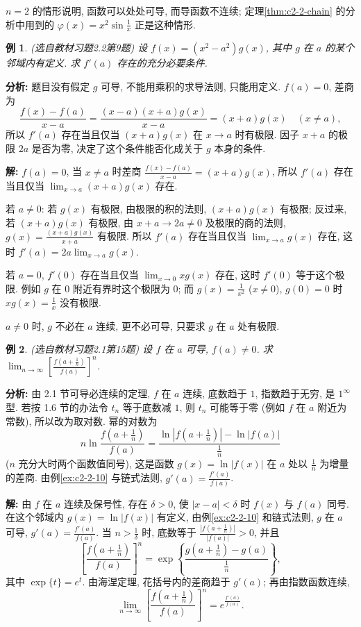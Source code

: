 \documentclass[UTF8,openany]{ctexbook}
\theoremstyle{chinesetextbook}
\newtheorem{example}{例}[section]
\newenvironment{cnsolution}{\par\indent\textbf{解:} \ignorespaces}{\par}
\begin{document}
$n=2$ 的情形说明, 函数可以处处可导, 而导函数不连续; 定理\ref{thm:c2-2-chain} 的分析中用到的 $\displaystyle\varphi(x)=x^2\sin\frac1x$ 正是这种情形.
\begin{example}\label{ex:c2-h2-9}
\textnormal{(选自教材习题2.2第9题)} 设 $f(x)=(x^2-a^2)g(x)$, 其中 $g$ 在 $a$ 的某个邻域内有定义. 求 $f'(a)$ 存在的充分必要条件.
\end{example}
\par\indent\textbf{分析:} 题目没有假定 $g$ 可导, 不能用乘积的求导法则, 只能用定义. $f(a)=0$, 差商为
\[
\frac{f(x)-f(a)}{x-a}=\frac{(x-a)(x+a)g(x)}{x-a}=(x+a)g(x)\quad(x\ne a),
\]
所以 $f'(a)$ 存在当且仅当 $(x+a)g(x)$ 在 $x\to a$ 时有极限. 因子 $x+a$ 的极限 $2a$ 是否为零, 决定了这个条件能否化成关于 $g$ 本身的条件.
\begin{cnsolution}
$f(a)=0$, 当 $x\ne a$ 时差商 $\displaystyle\frac{f(x)-f(a)}{x-a}=(x+a)g(x)$, 所以 $f'(a)$ 存在当且仅当 $\displaystyle\lim_{x\to a}(x+a)g(x)$ 存在.

若 $a\ne0$: 若 $g(x)$ 有极限, 由极限的积的法则, $(x+a)g(x)$ 有极限; 反过来, 若 $(x+a)g(x)$ 有极限, 由 $x+a\to2a\ne0$ 及极限的商的法则, $\displaystyle g(x)=\frac{(x+a)g(x)}{x+a}$ 有极限. 所以 $f'(a)$ 存在当且仅当 $\displaystyle\lim_{x\to a}g(x)$ 存在, 这时 $\displaystyle f'(a)=2a\lim_{x\to a}g(x)$.

若 $a=0$, $f'(0)$ 存在当且仅当 $\displaystyle\lim_{x\to0}xg(x)$ 存在, 这时 $f'(0)$ 等于这个极限. 例如 $g$ 在 $0$ 附近有界时这个极限为 $0$; 而 $\displaystyle g(x)=\frac1{x^2}$ ($x\ne0$), $g(0)=0$ 时 $\displaystyle xg(x)=\frac1x$ 没有极限.
\end{cnsolution}
$a\ne0$ 时, $g$ 不必在 $a$ 连续, 更不必可导, 只要求 $g$ 在 $a$ 处有极限.
\begin{example}\label{ex:c2-h1-15}
\textnormal{(选自教材习题2.1第15题)} 设 $f$ 在 $a$ 可导, $f(a)\ne0$. 求 $\displaystyle\lim_{n\to\infty}\left[\frac{f\left(a+\frac1n\right)}{f(a)}\right]^n$.
\end{example}
\par\indent\textbf{分析:} 由 2.1 节可导必连续的定理, $f$ 在 $a$ 连续, 底数趋于 $1$, 指数趋于无穷, 是 $1^\infty$ 型. 若按 1.6 节的办法令 $t_n$ 等于底数减 $1$, 则 $t_n$ 可能等于零 (例如 $f$ 在 $a$ 附近为常数), 所以改为取对数. 幂的对数为
\[
n\ln\frac{f\left(a+\frac1n\right)}{f(a)}=\frac{\ln\left|f\left(a+\frac1n\right)\right|-\ln|f(a)|}{\frac1n}
\]
($n$ 充分大时两个函数值同号), 这是函数 $g(x)=\ln|f(x)|$ 在 $a$ 处以 $\displaystyle\frac1n$ 为增量的差商. 由例\ref{ex:c2-2-10} 与链式法则, $\displaystyle g'(a)=\frac{f'(a)}{f(a)}$.
\begin{cnsolution}
由 $f$ 在 $a$ 连续及保号性, 存在 $\delta>0$, 使 $|x-a|<\delta$ 时 $f(x)$ 与 $f(a)$ 同号. 在这个邻域内 $g(x)=\ln|f(x)|$ 有定义, 由例\ref{ex:c2-2-10} 和链式法则, $g$ 在 $a$ 可导, $\displaystyle g'(a)=\frac{f'(a)}{f(a)}$. 当 $\displaystyle n>\frac1\delta$ 时, 底数等于 $\displaystyle\frac{\left|f\left(a+\frac1n\right)\right|}{|f(a)|}>0$, 并且
\[
\left[\frac{f\left(a+\frac1n\right)}{f(a)}\right]^n=\exp\left\{\frac{g\left(a+\frac1n\right)-g(a)}{\frac1n}\right\},
\]
其中 $\exp\{t\}=e^t$. 由海涅定理, 花括号内的差商趋于 $g'(a)$; 再由指数函数连续,
\[
\lim_{n\to\infty}\left[\frac{f\left(a+\frac1n\right)}{f(a)}\right]^n=e^{\frac{f'(a)}{f(a)}}.
\]
\end{cnsolution}
\end{document}
